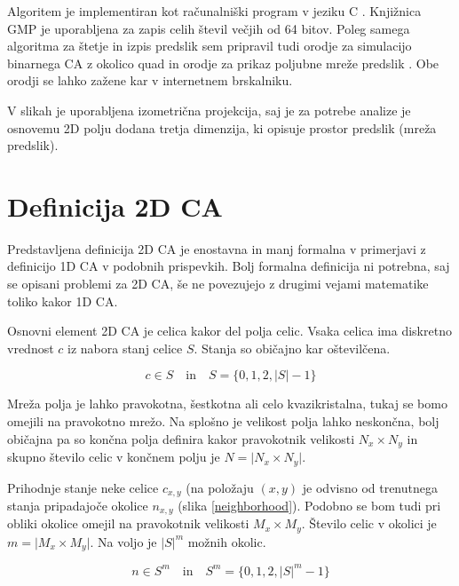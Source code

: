 \documentclass[12pt,a4paper,openany,twoside]{book}
\begin{document}
Algoritem je implementiran kot računalniški program v jeziku C \cite{Jeras2016-algirithm}.
Knjižnica GMP je uporabljena za zapis celih števil večjih od 64 bitov.
Poleg samega algoritma za štetje in izpis predslik sem pripravil tudi
orodje za simulacijo binarnega CA z okolico quad \cite{Jeras2016-quad}
in orodje za prikaz poljubne mreže predslik \cite{Jeras2016-network}.
Obe orodji se lahko zažene kar v internetnem brskalniku.

V slikah je uporabljena izometrična projekcija,
saj je za potrebe analize je osnovemu 2D polju dodana tretja dimenzija,
ki opisuje prostor predslik (mreža predslik).

\chapter{Definicija 2D CA}

Predstavljena definicija 2D CA je enostavna in manj formalna
v primerjavi z definicijo 1D CA v podobnih prispevkih.
Bolj formalna definicija ni potrebna, saj se opisani problemi za 2D CA,
še ne povezujejo z drugimi vejami matematike toliko kakor 1D CA.

Osnovni element 2D CA je celica kakor del polja celic.
Vsaka celica ima diskretno vrednost \(c\) iz nabora stanj celice \(S\).
Stanja so običajno kar oštevilčena.

\begin{equation}
c \in S
\quad \textrm{in} \quad
S = \{ 0, 1, 2, {\lvert S \rvert} -1 \}
\end{equation}

Mreža polja je lahko pravokotna, šestkotna ali celo kvazikristalna, tukaj se
bomo omejili na pravokotno mrežo. Na splošno je velikost polja lahko neskončna,
bolj običajna pa so končna polja definira kakor pravokotnik velikosti \(N_x \times N_y\)
in skupno število celic v končnem polju je \(N=\lvert N_x \times N_y \rvert\).

Prihodnje stanje neke celice \(c_{x,y}\) (na položaju \((x,y)\)
je odvisno od trenutnega stanja pripadajoče okolice \(n_{x,y}\) (slika \ref{neighborhood}).
Podobno se bom tudi pri obliki okolice omejil na pravokotnik velikosti \(M_x \times M_y\).
Število celic v okolici je \(m=\lvert M_x \times M_y \rvert\).
Na voljo je \({\lvert S \rvert}^m\) možnih okolic.

\begin{equation}
n \in S^m
\quad \textrm{in} \quad
S^m = \{ 0, 1, 2, {\lvert S \rvert}^m -1 \}
\end{equation}
\end{document}
